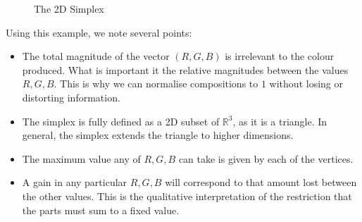 \usetikzlibrary{fadings}
\begin{figure}
 \begin{center}


    \caption{The 2D Simplex}
    \label{fig:rgbsimplex}
    
\end{center}
\end{figure}




Using this example, we note several points: 
\begin{itemize}
    \item The total magnitude of the vector $(R,G,B)$ is irrelevant to the colour produced. What is important it the relative magnitudes between the values $R,G,B$. This is why we can normalise compositions to $1$ without losing or distorting information.   
    \item The simplex is fully defined as a 2D subset of $\mathbb{R}^3$, as it is a triangle. In general, the simplex extends the triangle to higher dimensions.  
    \item The maximum value any of $R,G,B$ can take is given by each of the vertices.
    \item A gain in any particular $R,G,B$ will correspond to that amount lost between the other values. This is the qualitative interpretation of the restriction that the parts must sum to a fixed value. 
\end{itemize}
\pagebreak



